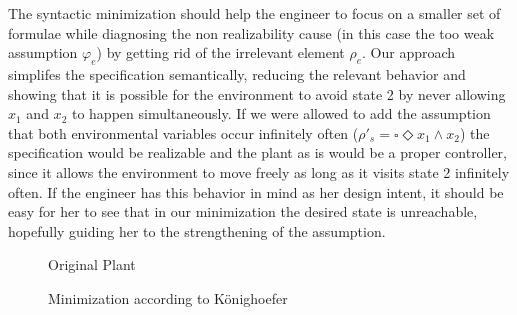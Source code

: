 The syntactic minimization should help the engineer to focus on a smaller set of formulae while diagnosing the non realizability cause (in this case the too weak assumption $\varphi_e$) by getting rid of the irrelevant element $\rho_e$. Our approach simplifes the specification semantically, reducing the relevant behavior and showing that it is possible for the environment to avoid state 2 by never allowing $x_1$ and $x_2$ to happen simultaneously. If we were allowed to add the assumption that both environmental variables occur infinitely often ($\rho'_s = \square \Diamond x_1 \wedge x_2$) the specification would be realizable and the plant as is would be a proper controller, since it allows the environment to move freely as long as it visits state 2 infinitely often. If the engineer has this behavior in mind as her design intent, it should be easy for her to see that in our minimization the desired state is unreachable, hopefully guiding her to the strengthening of the assumption.  
\newpage
\begin{figure}[bt]
\centering
\SmallPicture
{}
\caption{Original Plant}
\label{fig:konig_original_plant}
\MediumPicture
\end{figure}
\begin{figure}[bt]
	\centering
	\SmallPicture
	\caption{Minimization according to Könighoefer}
	\label{fig:konig_original_plant_k}
	\MediumPicture
\end{figure}

